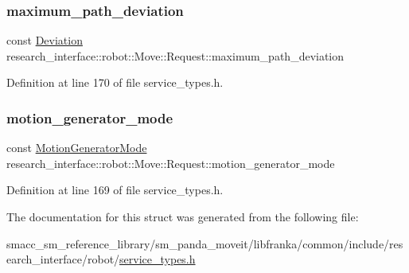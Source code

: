 \mbox{\label{structresearch__interface_1_1robot_1_1Move_1_1Request_ace5bcd09768e2cba8ba1e4833d61927d}} 
\subsubsection{\texorpdfstring{maximum\+\_\+path\+\_\+deviation}{maximum\_path\_deviation}}
{\footnotesize\ttfamily const \hyperlink{structresearch__interface_1_1robot_1_1Move_1_1Deviation}{Deviation} research\+\_\+interface\+::robot\+::\+Move\+::\+Request\+::maximum\+\_\+path\+\_\+deviation}



Definition at line 170 of file service\+\_\+types.\+h.

\mbox{\label{structresearch__interface_1_1robot_1_1Move_1_1Request_a550736be5350d0987a133557a8757fd5}} 
\subsubsection{\texorpdfstring{motion\+\_\+generator\+\_\+mode}{motion\_generator\_mode}}
{\footnotesize\ttfamily const \hyperlink{structresearch__interface_1_1robot_1_1Move_a334b8380507154e8042b57fbd3287c0f}{Motion\+Generator\+Mode} research\+\_\+interface\+::robot\+::\+Move\+::\+Request\+::motion\+\_\+generator\+\_\+mode}



Definition at line 169 of file service\+\_\+types.\+h.



The documentation for this struct was generated from the following file\+:\begin{DoxyCompactItemize}
\item 
smacc\+\_\+sm\+\_\+reference\+\_\+library/sm\+\_\+panda\+\_\+moveit/libfranka/common/include/research\+\_\+interface/robot/\hyperlink{service__types_8h}{service\+\_\+types.\+h}\end{DoxyCompactItemize}
